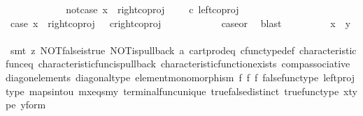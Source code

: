 \begin{isabellebody}
\ \ \ \ \isamarkupfalse%
\isanewline
\ \ \ \ \ \ \isamarkupfalse%
\ not{\isacharunderscore}{\kern0pt}case{}{\isacharcolon}{\kern0pt}\ {\isachardoublequoteopen}x\ {\isasymnoteq}\ right{\isacharunderscore}{\kern0pt}coproj\ {\isasymone}\ {\isacharparenleft}{\kern0pt}{\isasymone}\ {\isasymCoprod}\ {\isasymone}{\isacharparenright}{\kern0pt}\ {\isasymcirc}\isactrlsub c\ left{\isacharunderscore}{\kern0pt}coproj\ {\isasymone}\ {\isasymone}{\isachardoublequoteclose}\isanewline
\ \ \ \ \ \ \isamarkupfalse%
\ \isamarkupfalse%
\ case{}{\isacharcolon}{\kern0pt}\ {\isachardoublequoteopen}x\ {\isacharequal}{\kern0pt}\ right{\isacharunderscore}{\kern0pt}coproj\ {\isasymone}\ {\isacharparenleft}{\kern0pt}{\isasymone}{\isasymCoprod}{\isasymone}{\isacharparenright}{\kern0pt}\ {\isasymcirc}\isactrlsub c{\isacharparenleft}{\kern0pt}right{\isacharunderscore}{\kern0pt}coproj\ {\isasymone}\ {\isasymone}{\isacharparenright}{\kern0pt}{\isachardoublequoteclose}\isanewline
\ \ \ \ \ \ \ \ \isamarkupfalse%
\ case{}{\isacharunderscore}{\kern0pt}or{\isacharunderscore}{\kern0pt}{}\ \isamarkupfalse%
\ blast\isanewline
\ \ \ \ \ \ \isamarkupfalse%
\ \isamarkupfalse%
\ {\isachardoublequoteopen}x\ {\isacharequal}{\kern0pt}\ y{\isachardoublequoteclose}\isanewline
\ \ \ \ \ \ \ \ \isamarkupfalse%
\ {\isacharparenleft}{\kern0pt}smt\ {\isacharparenleft}{\kern0pt}z{}{\isacharparenright}{\kern0pt}\ NOT{\isacharunderscore}{\kern0pt}false{\isacharunderscore}{\kern0pt}is{\isacharunderscore}{\kern0pt}true\ NOT{\isacharunderscore}{\kern0pt}is{\isacharunderscore}{\kern0pt}pullback\ a{}\ cart{\isacharunderscore}{\kern0pt}prod{\isacharunderscore}{\kern0pt}eq{}\ cfunc{\isacharunderscore}{\kern0pt}type{\isacharunderscore}{\kern0pt}def\ characteristic{\isacharunderscore}{\kern0pt}func{\isacharunderscore}{\kern0pt}eq\ characteristic{\isacharunderscore}{\kern0pt}func{\isacharunderscore}{\kern0pt}is{\isacharunderscore}{\kern0pt}pullback\ characteristic{\isacharunderscore}{\kern0pt}function{\isacharunderscore}{\kern0pt}exists\ comp{\isacharunderscore}{\kern0pt}associative\ diag{\isacharunderscore}{\kern0pt}on{\isacharunderscore}{\kern0pt}elements\ diagonal{\isacharunderscore}{\kern0pt}type\ element{\isacharunderscore}{\kern0pt}monomorphism\ f{}\ f{}\ f{}\ false{\isacharunderscore}{\kern0pt}func{\isacharunderscore}{\kern0pt}type\ left{\isacharunderscore}{\kern0pt}proj{\isacharunderscore}{\kern0pt}type\ maps{\isacharunderscore}{\kern0pt}into{\isacharunderscore}{\kern0pt}{}u{}\ mx{\isacharunderscore}{\kern0pt}eqs{\isacharunderscore}{\kern0pt}my\ terminal{\isacharunderscore}{\kern0pt}func{\isacharunderscore}{\kern0pt}unique\ true{\isacharunderscore}{\kern0pt}false{\isacharunderscore}{\kern0pt}distinct\ true{\isacharunderscore}{\kern0pt}func{\isacharunderscore}{\kern0pt}type\ x{\isacharunderscore}{\kern0pt}type\ y{\isacharunderscore}{\kern0pt}form{\isacharparenright}{\kern0pt}\isanewline

\end{isabellebody}
